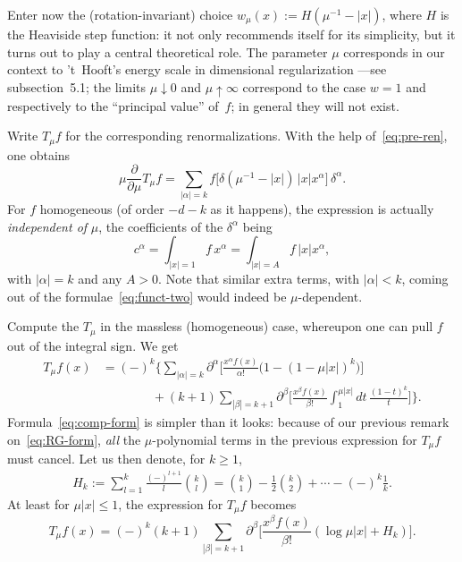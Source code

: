 \documentclass[a4paper,12pt]{article}
\renewcommand{\a}{\alpha}          %
\renewcommand{\b}{\beta}           %
\newcommand{\del}{\partial}        %
\newcommand{\dl}{\delta}           %
\newcommand{\nn}{\nonumber}        %
\newcommand{\7}{\dagger}           %
\theoremstyle{plain}
\theoremstyle{definition}
\begin{document}
Enter now the (rotation-invariant) choice
$w_\mu(x) := H(\mu^{-1} - |x|)$, where $H$ is the Heaviside step
function: it not only recommends itself for its simplicity, but it
turns out to play a central theoretical role. The parameter $\mu$
corresponds in our context to 't~Hooft's energy scale in dimensional
regularization ---see subsection~5.1; the limits $\mu \downarrow 0$
and $\mu \uparrow \infty$ correspond to the case $w = 1$ and
respectively to the ``principal value'' of~$f$; in general they will
not exist.

Write $T_\mu f$ for the corresponding renormalizations. With the help
of~\eqref{eq:pre-ren}, one obtains
\begin{equation}
\mu\frac{\del}{\del\mu} T_\mu f =
\sum_{|\a|=k} f\bigl[ \dl(\mu^{-1}-|x|)\,|x|x^\a \bigr]\,\dl^\a.
\label{eq:RG-form}
\end{equation}
For $f$ homogeneous (of order $-d-k$ as it happens), the expression is
actually \textit{independent of} $\mu$, the coefficients of the
$\dl^\a$ being
\begin{equation}
c^\a = \int_{|x|=1} f\,x^\a = \int_{|x|=A} f\,|x| x^\a,
\label{eq:c-coefs}
\end{equation}
with $|\a| = k$ and any $A > 0$. Note that similar extra terms, with
$|\a| < k$, coming out of the formulae~\eqref{eq:funct-two} would
indeed be $\mu$-dependent.

\smallskip

Compute the $T_\mu$ in the massless (homogeneous) case, whereupon one
can pull $f$ out of the integral sign. We get
\begin{align}
T_\mu f(x) &= (-)^k \biggl\{ \sum_{|\a|=k} \del^\a \biggl[
\frac{x^\a f(x)}{\a!} \bigl( 1 - (1-\mu|x|)^k \bigr) \biggr]
\nn \\
&\qquad\qquad + (k+1) \sum_{|\b|=k+1} \del^\b \biggl[
\frac{x^\b f(x)}{\b!} \int_1^{\mu|x|} dt\, \frac{(1-t)^k}{t}
\biggr] \biggr\}.
\label{eq:comp-form}
\end{align}
Formula~\eqref{eq:comp-form} is simpler than it looks: because of our
previous remark on~\eqref{eq:RG-form}, \textit{all} the
$\mu$-polynomial terms in the previous expression for $T_\mu f$ must
cancel. Let us then denote, for $k\geq 1$,
\begin{eqnarray}
H_k:= \sum_{l=1}^k \frac{(-)^{l+1}}{l} \binom{k}{l} =
\binom{k}{1} - \frac{1}{2} \binom{k}{2} +\cdots- (-)^k \frac{1}{k}.
\label{eq:harmonic}
\end{eqnarray}
At least for $\mu|x| \leq 1$, the expression for $T_\mu f$ becomes
$$
T_\mu f(x) = (-)^k (k+1) \sum_{|\b|=k+1}
\del^\b \biggl[ \frac{x^\b f(x)}{\b!} (\log\mu|x| + H_k) \biggr].
$$
\end{document}
